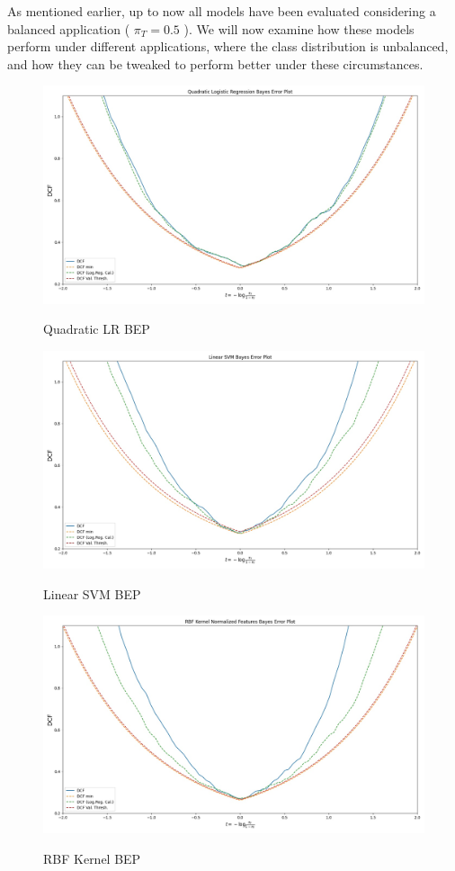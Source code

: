 \documentclass[12pt, twocolumn]{article}
\begin{document}
\newpage

As mentioned earlier, up to now all models have been evaluated considering a balanced application ( $\pi_T = 0.5$ ).
We will now examine how these models perform under different applications, where the class distribution is unbalanced,
and how they can be tweaked to perform better under these circumstances.

\begin{figure}[H] 
    {\includegraphics[width=\linewidth]{logregquadBEP.jpg}}
    \caption{Quadratic LR BEP}
    \label{fig:disthist}
\end{figure}

\begin{figure}[H] 
    {\includegraphics[width=\linewidth]{linsvmBEP.jpg}}
    \caption{Linear SVM BEP}
    \label{fig:disthist}
\end{figure}

\begin{figure}[H] 
    {\includegraphics[width=\linewidth]{RBFNormalizedBEP.jpg}}
    \caption{RBF Kernel BEP}
    \label{fig:disthist}
\end{figure}
\end{document}
